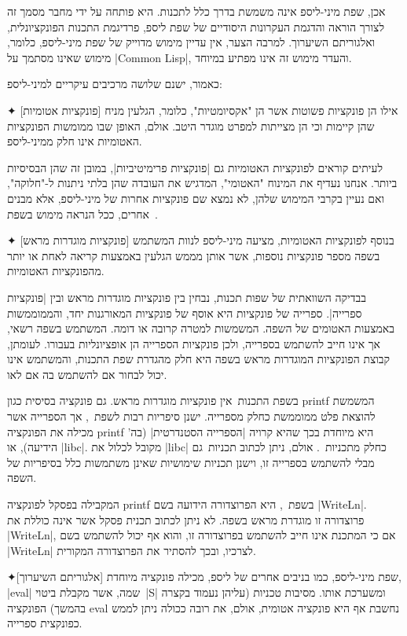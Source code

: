 אכן, שפת מיני-ליספ אינה משמשת בדרך כלל לתכנות. היא פותחה על ידי מחבר מסמך זה
לצורך הוראה והדגמת העקרונות היסודיים של שפת ליספ, פרדיגמת התכנות הפונקציונלית,
ואלגוריתם השיערוך. למרבה הצער, אין עדיין מימוש מדוייק של שפת מיני-ליספ, כלומר,
מימוש שאינו מסתמך על \E|Common Lisp|, והעדר מימוש זה אינו מפתיע במיוחד.

כאמור, ישנם שלושה מרכיבים עיקריים למיני-ליספ:
\begin{description}
  ✦ [פונקציות אטומיות] אילו הן פונקציות פשוטות אשר הן "אקסיומטיות", כלומר,
  הגלעין מניח שהן קיימות וכי הן מצייתות למפרט מוגדר היטב. אולם, האופן שבו
  ממומשות הפונקציות האטומיות אינו חלק ממיני-ליספ.

  לעיתים קוראים לפונקציות האטומיות גם \ע|פונקציות פרימיטיביות|, במובן זה שהן
  הבסיסיות ביותר. אנחנו נעדיף את המינוח "האטומי", המדגיש את העובדה שהן בלתי
  ניתנות ל-"חלוקה", ואם נעיין בקרבי המימוש שלהן, לא נמצא שם פונקציות אחרות של
  מיני-ליספ, אלא מבנים אחרים, ככל הנראה מימוש בשפת~\CPL.

  ✦ [פונקציות מוגדרות מראש] בנוסף לפונקציות האטומיות, מציעה מיני-ליספ לנוות
  המשתמש בשפה מספר פונקציות נוספות, אשר אותן מממש הגלעין באמצעות קריאה
  לאחת או יותר מהפונקציות האטומיות.

  בבדיקה השוואתית של שפות תכנות, נבחין בין פונקציות מוגדרות מראש ובין
  \ע|פונקציות ספרייה|. ספרייה של פונקציות היא אוסף של פונקציות המאורגנות יחד,
  והממוממשות באמצעות האטומים של השפה. המשמשות למטרה קרובה או דומה. המשתמש
  בשפה רשאי, אך אינו חייב להשתמש בספרייה, ולכן פונקציות הספרייה הן אופציונליות
  בעבורו. לעומתן, קבוצת הפונקציות המוגדרות מראש בשפה היא חלק מהגדרת שפת התכנות,
  והמשתמש אינו יכול לבחור אם להשתמש בה אם לאו.

  בשפת התכנות~\CPL אין פונקציות מוגדרות מראש. גם פונקציה בסיסית כגון printf
  המשמשת להוצאת פלט ממוממשת כחלק מספרייה. ישנן סיפריות רבות לשפת~\CPL, אך
  הספרייה אשר מכילה את הפונקציה printf היא מיוחדת בכך שהיא קרויה \ע|הספרייה
  הסטנדרטית| (בה' הידיעה), או \E|libc|. מקובל לכלול את \E|libc| כחלק
  מתכניות~\CPL. אולם, ניתן לכתוב תכניות~\CPL גם מבלי להשתמש בספרייה זו, וישנן
  תכניות שימושיות שאינן משתמשות כלל בסיפריות של השפה.

  המקבילה בפסקל לפונקציה printf בשפת~\CPL, היא הפרוצדורה הידועה בשם
  \E|WriteLn|. פרוצדורה זו מוגדרת מראש בשפה. לא ניתן לכתוב תכנית פסקל אשר אינה
  כוללת את \E|WriteLn|, אם כי המתכנת אינו חייב להשתמש בפרוצדורה זו, והוא אף
  יכול להשתמש בשם \E|WriteLn| לצרכיו, ובכך להסתיר את הפרוצדורה המקורית.

  ✦[אלגוריתם השיערוך] שפת מיני-ליספ, כמו בניבים אחרים של ליספ, מכילה פונקציה
  מיוחדת, \E|eval| שמה, אשר מקבלת ביטוי~\E|S| ומשערכת אותו. מסיבות טכניות
  (עליהן נעמוד בקצרה בהמשך) הפונקציה eval נחשבת אף היא פונקציה אטומית, אולם, את
  רובה ככולה ניתן לממש כפונקצית ספרייה.
\end{description}

